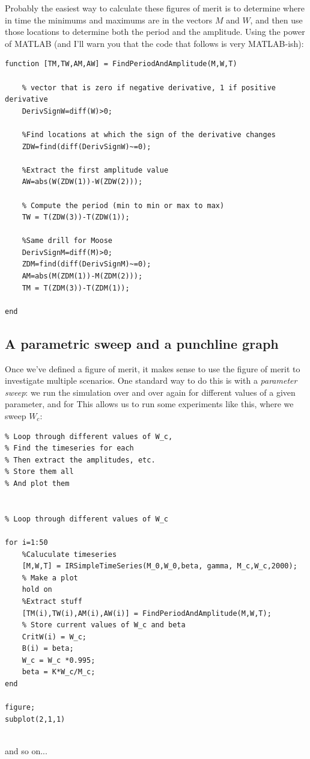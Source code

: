 Probably the easiest way to calculate these figures of merit is to determine where in time the minimums and maximums are in the vectors $M$ and $W$, and then use those locations to determine both the period and the amplitude.  Using the power of MATLAB (and I'll warn you that the code that follows is very MATLAB-ish):

\begin{verbatim}
function [TM,TW,AM,AW] = FindPeriodAndAmplitude(M,W,T)

    % vector that is zero if negative derivative, 1 if positive derivative
    DerivSignW=diff(W)>0; 

    %Find locations at which the sign of the derivative changes
    ZDW=find(diff(DerivSignW)~=0); 

    %Extract the first amplitude value
    AW=abs(W(ZDW(1))-W(ZDW(2))); 

    % Compute the period (min to min or max to max)
    TW = T(ZDW(3))-T(ZDW(1)); 

    %Same drill for Moose
    DerivSignM=diff(M)>0; 
    ZDM=find(diff(DerivSignM)~=0); 
    AM=abs(M(ZDM(1))-M(ZDM(2))); 
    TM = T(ZDM(3))-T(ZDM(1));

end
\end{verbatim}

\subsection{A parametric sweep and a punchline graph}

Once we've defined a figure of merit, it makes sense to use the figure of merit to investigate multiple scenarios.  One standard way to do this is with a {\it parameter sweep}:  we run the simulation over and over again for different values of a given parameter, and for This allows us to run some experiments like this, where we sweep $W_c$:

\begin{verbatim}
% Loop through different values of W_c,
% Find the timeseries for each
% Then extract the amplitudes, etc.
% Store them all
% And plot them


% Loop through different values of W_c

for i=1:50
    %Caluculate timeseries
    [M,W,T] = IRSimpleTimeSeries(M_0,W_0,beta, gamma, M_c,W_c,2000);
    % Make a plot
    hold on
    %Extract stuff
    [TM(i),TW(i),AM(i),AW(i)] = FindPeriodAndAmplitude(M,W,T);
    % Store current values of W_c and beta
    CritW(i) = W_c;
    B(i) = beta;
    W_c = W_c *0.995;
    beta = K*W_c/M_c;
end

figure;
subplot(2,1,1)
    
\end{verbatim}
and so on...

